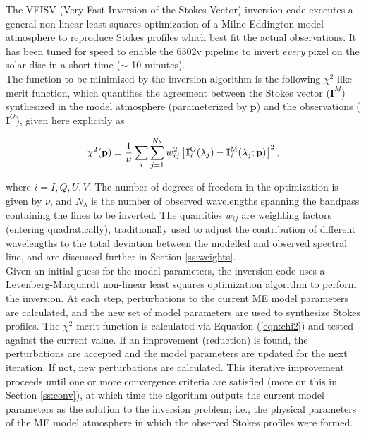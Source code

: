 \documentclass[11pt]{article}
\begin{document}
The VFISV (Very Fast Inversion of the Stokes Vector) inversion code executes a general
non-linear least-squares optimization of a Milne-Eddington model atmosphere to reproduce
Stokes profiles which best fit the actual observations.  It has been tuned for speed
to enable the \solisvsm 6302v pipeline to invert \textit{every} pixel on the solar
disc in a short time ($\sim$ 10 minutes).\\

The function to be minimized by the inversion algorithm is the following
$\chi^{2}$-like merit function, which quantifies the agreement between the Stokes vector
($\mathbf{I}^{M}$) synthesized in the model atmosphere (parameterized by $\mathbf{p}$)
and the observations ($\mathbf{I}^{O}$), given here explicitly as

\begin{equation}\label{eqn:chi2}
\chi^{2}(\mathbf{p}) = \frac{1}{\nu}\displaystyle\sum\limits_{i} \displaystyle\sum\limits_{j=1}^{N_{\lambda}}
        w^{2}_{ij}\left[\mathbf{I}^{\mathrm{O}}_{i}(\lambda_{j}) -
        \mathbf{I}^{\mathrm{M}}_{i}(\lambda_{j};\mathbf{p})\right]^{2},
\end{equation}

where $i=I,Q,U,V$. The number of degrees of freedom in the optimization is given by $\nu$, and
$N_{\lambda}$ is the number of observed wavelengths spanning the bandpass containing the lines
to be inverted.  The quantities $w_{ij}$ are weighting factors (entering quadratically),
traditionally used to adjust the contribution of different wavelengths to the total deviation
between the modelled and observed spectral line, and are discussed further in Section
\ref{ss:weights}.\\

Given an initial guess for the model parameters, the inversion code uses a Levenberg-Marquardt
non-linear least squares optimization algorithm to perform the inversion.  At each step,
perturbations to the current ME model parameters are calculated, and the new set of model
parameters are used to synthesize Stokes profiles.  The $\chi^{2}$ merit function is 
calculated via Equation (\ref{eqn:chi2}) and tested against the current value.  If an
improvement (reduction) is found, the perturbations are accepted and the model parameters
are updated for the next iteration.  If not, new perturbations are calculated.  This iterative
improvement proceeds until one or more convergence criteria are satisfied (more on this in Section
\ref{ss:conv}), at which time the algorithm outputs the current model parameters as the solution
to the inversion problem; i.e., the physical parameters of the ME model atmosphere in which the
observed Stokes profiles were formed.
\end{document}
